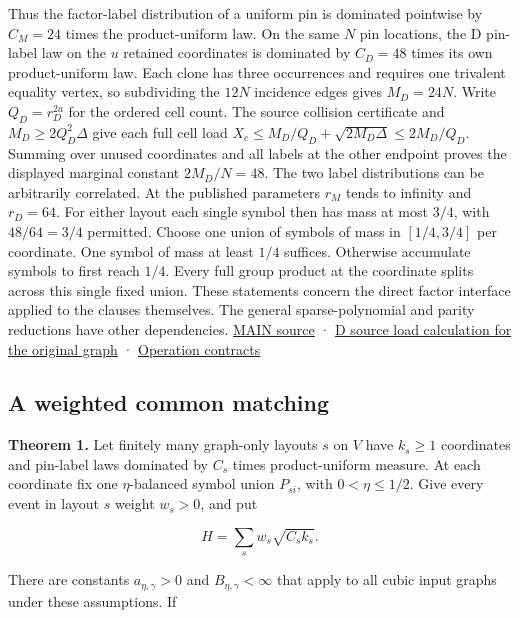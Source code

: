\documentclass[
  11pt,
]{article}
\begin{document}
Thus the factor-label distribution of a uniform pin is dominated
pointwise by \(C_M=24\) times the product-uniform law. On the same \(N\)
pin locations, the D pin-label law on the \(u\) retained coordinates is
dominated by \(C_D=48\) times its own product-uniform law. Each clone
has three occurrences and requires one trivalent equality vertex, so
subdividing the \(12N\) incidence edges gives \(M_D=24N\). Write
\(Q_D=r_D^{2a}\) for the ordered cell count. The source collision
certificate and \(M_D\ge2Q_D^2\Delta\) give each full cell load
\(X_c\le M_D/Q_D+\sqrt{2M_D\Delta}\le2M_D/Q_D\). Summing over unused
coordinates and all labels at the other endpoint proves the displayed
marginal constant \(2M_D/N=48\). The two label distributions can be
arbitrarily correlated. At the published parameters \(r_M\) tends to
infinity and \(r_D=64\). For either layout each single symbol then has
mass at most \(3/4\), with \(48/64=3/4\) permitted. Choose one union of
symbols of mass in \([1/4,3/4]\) per coordinate. One symbol of mass at
least \(1/4\) suffices. Otherwise accumulate symbols to first reach
\(1/4\). Every full group product at the coordinate splits across this
single fixed union. These statements concern the direct factor interface
applied to the clauses themselves. The general sparse-polynomial and
parity reductions have other dependencies.
\href{https://github.com/openai/math/blob/main/preprints/The-Exponential-Time-Hypothesis-is-False-October-25-2026/build/main_full_version.tex}{MAIN
source} · \href{https://github.com/dch-and-Elara/some-research-inspired-by-openais-eth-preprint/tree/main/root-separation}{D source
load calculation for the original graph} ·
\href{https://github.com/dch-and-Elara/some-research-inspired-by-openais-eth-preprint/tree/main/rank-budget-barriers}{Operation contracts}

\subsection{A weighted common
matching}\label{a-weighted-common-matching}

\textbf{Theorem 1.} Let finitely many graph-only layouts \(s\) on \(V\)
have \(k_s\ge1\) coordinates and pin-label laws dominated by \(C_s\)
times product-uniform measure. At each coordinate fix one
\(\eta\)-balanced symbol union \(P_{si}\), with \(0<\eta\le1/2\). Give
every event in layout \(s\) weight \(w_s>0\), and put

\[
 H=\sum_s w_s\sqrt{C_s k_s}.
\]

There are constants \(a_{\eta,\gamma}>0\) and \(B_{\eta,\gamma}<\infty\)
that apply to all cubic input graphs under these assumptions. If
\end{document}
